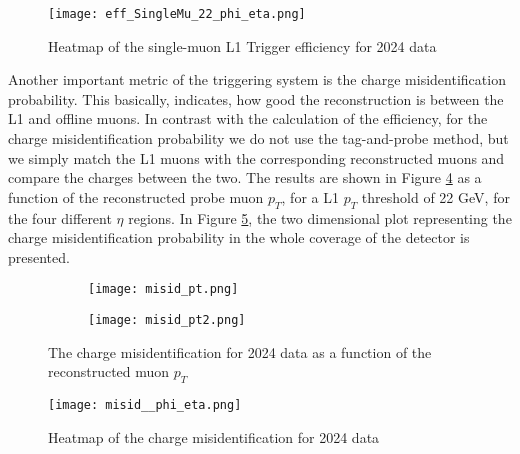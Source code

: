 \begin{figure}[H]
    \centering
    \texttt{[image: eff\_SingleMu\_22\_phi\_eta.png]}
    \caption{Heatmap of the single-muon L1 Trigger efficiency for 2024 data}
    \label{fig:eff_eta_phi}
\end{figure}
\indent Another important metric of the triggering system is the charge misidentification probability. This basically, indicates, how good the reconstruction is between the L1 and offline muons. In contrast with the calculation of the efficiency, for the charge misidentification probability we do not use the tag-and-probe method, but we simply match the L1 muons with the corresponding reconstructed muons and compare the charges between the two. The results are shown in Figure \ref{fig:misid_pt} as a function of the reconstructed probe muon $p_T$, for a L1 $p_T$ threshold of 22 GeV, for the four different $\eta$ regions. In Figure \ref{fig:misid_eta_phi}, the two dimensional plot representing the charge misidentification probability in the whole coverage of the detector is presented.

\begin{figure}[H]
    \centering
    \begin{subfigure}{0.48\textwidth}
        \texttt{[image: misid\_pt.png]}
        \caption{}
        \label{subfig:misid_pt}
    \end{subfigure}
    \begin{subfigure}{0.48\textwidth}
        \texttt{[image: misid\_pt2.png]}
        \caption{}
        \label{subfig:misid_pt2}        
    \end{subfigure} 
    \caption{The charge misidentification for 2024 data as a function of the reconstructed muon $p_T$}
    \label{fig:misid_pt}
\end{figure}

\begin{figure}[H]
    \centering
    \texttt{[image: misid\_\_phi\_eta.png]}
    \caption{Heatmap of the charge misidentification for 2024 data}
    \label{fig:misid_eta_phi}
\end{figure}
